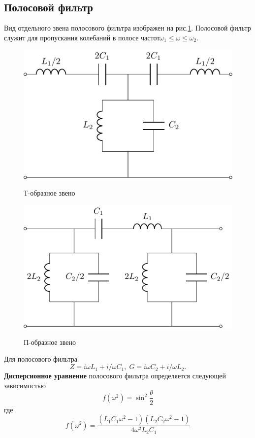 \subsection{Полосовой фильтр}
Вид отдельного звена полосового фильтра изображен на рис.\ref{fig:7.1}. Полосовой фильтр служит для пропускания колебаний в полосе частот$\omega_1\leq\omega\leq\omega_2$.
\begin{figure}[H]
	\begin{minipage}{0.49\linewidth}
		\centering
		\includegraphics[scale=0.8]{chem/FF/FFT.pdf}
		\caption*{Т-образное звено}
	\end{minipage}
	\begin{minipage}{0.49\linewidth}
		\centering
		\includegraphics[scale=0.8]{chem/FF/FFP.pdf}
		\caption*{П-образное звено}
	\end{minipage}
	\caption{}
	\label{fig:7.1}
\end{figure}
Для полосового фильтра
\begin{equation}
\label{eq:7.1}
Z=i\omega L_1+i/\omega C_1,\;G=i\omega C_2+i/\omega L_2.
\end{equation}
\textbf{Дисперсионное уравнение} полосового фильтра определяется следующей зависимостью
\begin{equation}
	\label{eq:7.2}
	f(\omega^2)=\sin^2\frac{\theta}{2}
\end{equation}
где
\begin{equation}
	\label{eq:7.3}
	f(\omega^2)=\frac{(L_1C_1\omega^2-1)(L_2C_2\omega^2-1)}{4\omega^2L_2C_1}
\end{equation}

